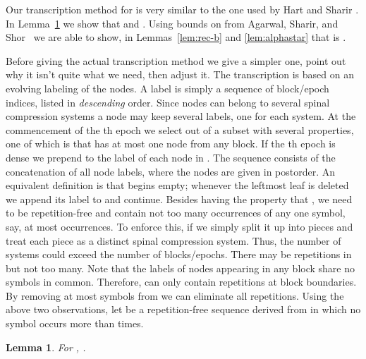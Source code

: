 \documentclass{article}
\newtheorem{lemma}[theorem]{Lemma}
\begin{document}
Our transcription method for 
is very similar to the one used by Hart and Sharir \cite{HS86}.  
In Lemma~\ref{lem:abaabba} we show that  and .
Using bounds on  from Agarwal, Sharir, and Shor~\cite{ASS89} we 
are able to show, in Lemmas~\ref{lem:rec-b} and \ref{lem:alphastar} that  is .

Before giving the actual transcription method we give a simpler one, point out why it 
isn't quite what we need, then adjust it.  The transcription is based on an evolving labeling
of the nodes.  A label is simply a sequence of block/epoch indices, listed in {\em descending} order.
Since nodes can belong to several spinal compression systems a node may keep several labels,
one for each system.
At the commencement of the th epoch we
select out of  a subset  with several properties, one of which is that
 has at most one node from any block.  If the th epoch is dense
we prepend  to the label of each node in .  The sequence  consists
of the concatenation of all node labels, where the nodes are given in postorder.  An equivalent definition
is that  begins empty; whenever the leftmost leaf is deleted we append its label to  and continue.
Besides having the property that , we need
 to be repetition-free and contain not too many occurrences of any one symbol,
say, at most  occurrences.  To enforce this, if  we simply split it up into  pieces
and treat each piece as a distinct spinal compression system.  Thus, the number of systems could 
exceed the number of blocks/epochs.  There may be repetitions in  but not too many.  Note that the labels
of nodes appearing in any block share no symbols in common.  Therefore,  can only contain repetitions at block boundaries.
By removing at most  symbols from  we can eliminate all repetitions.  
Using the above two observations, let  be a repetition-free sequence derived from  in 
which no symbol occurs more than  times.

\begin{lemma}\label{lem:abaabba}
For , .
\end{lemma}
\end{document}
